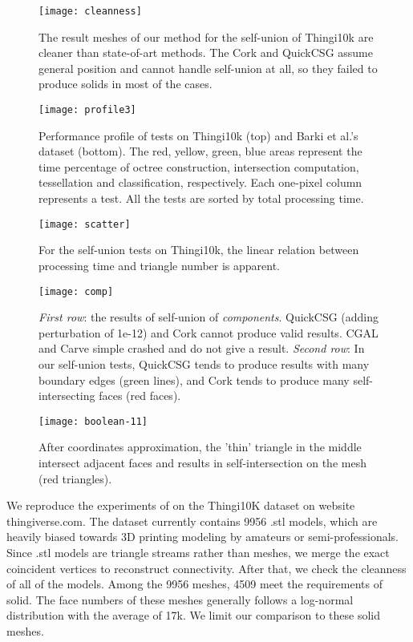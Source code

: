 \begin{figure}[t]
\centering
\texttt{[image: cleanness]}
\caption{The result meshes of our method for the self-union of Thingi10k are cleaner than state-of-art methods. The Cork and QuickCSG assume general position and cannot handle self-union at all, so they failed to produce solids in most of the cases.}
\label{fig:cleanness}
\end{figure}


\begin{figure}[t]
\centering
\texttt{[image: profile3]}
\caption{Performance profile of tests on Thingi10k (top) and Barki et al.'s dataset (bottom). The red, yellow, green, blue areas represent the time percentage of octree construction, intersection computation, tessellation and classification, respectively. Each one-pixel column represents a test. All the tests are sorted by total processing time.}
\label{fig:profile}
\end{figure}

\begin{figure}[t]
\centering
\texttt{[image: scatter]}
\caption{For the self-union tests on Thingi10k, the linear relation between processing time and triangle number is apparent.}
\label{fig:scatter}
\end{figure}


\begin{figure}[t]
\centering
\texttt{[image: comp]}
\caption{\emph{First row}: the results of self-union of \emph{components}. QuickCSG (adding perturbation of 1e-12) and Cork cannot produce valid results. CGAL and Carve simple crashed and do not give a result. \emph{Second row}: In our self-union tests, QuickCSG tends to produce results with many boundary edges (green lines), and Cork tends to produce many self-intersecting faces (red faces).}
\label{fig:perturb}
\end{figure}


\begin{figure}[t]
\centering
\texttt{[image: boolean-11]}
\caption{After coordinates approximation, the 'thin' triangle in the middle intersect adjacent faces and results in self-intersection on the mesh (red triangles).}
\label{fig:roundoff}
\end{figure}



We reproduce the experiments of \cite{zhou2016mesh} on the Thingi10K dataset on website thingiverse.com. The dataset currently contains 9956 .stl models, which are heavily biased towards 3D printing modeling by amateurs or semi-professionals. Since .stl models are triangle streams rather than meshes, we merge the exact coincident vertices to reconstruct connectivity. After that, we check the cleanness of all of the models. Among the 9956 meshes, 4509 meet the requirements of solid. The face numbers of these meshes generally follows a log-normal distribution with the average of 17k. We limit our comparison to these solid meshes.

